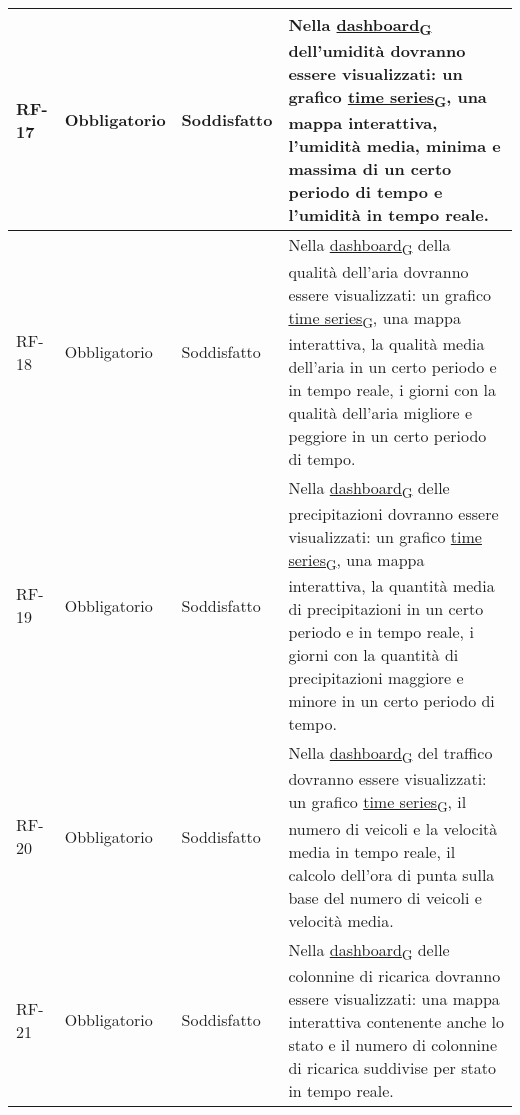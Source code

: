 \begin{longtable}{|>{\centering\arraybackslash}m{}|>{\centering\arraybackslash}m{}|>{\centering\arraybackslash}m{}|>{\centering\arraybackslash}m{}|}
	\\\hline
	RF-17           & Obbligatorio        & Soddisfatto & Nella \href{https://7last.github.io/docs/rtb/documentazione-interna/glossario\#dashboard}{dashboard\textsubscript{G}} dell'umidità dovranno essere visualizzati: un grafico \href{https://7last.github.io/docs/rtb/documentazione-interna/glossario\#time-series}{time series\textsubscript{G}}, una mappa interattiva, l'umidità media, minima e massima di un certo periodo di tempo e l'umidità in tempo reale.
	\\\hline
	RF-18           & Obbligatorio        & Soddisfatto & Nella \href{https://7last.github.io/docs/rtb/documentazione-interna/glossario\#dashboard}{dashboard\textsubscript{G}} della qualità dell'aria dovranno essere visualizzati: un grafico \href{https://7last.github.io/docs/rtb/documentazione-interna/glossario\#time-series}{time series\textsubscript{G}}, una mappa interattiva, la qualità media dell'aria in un certo periodo e in tempo reale, i giorni con la qualità dell'aria migliore e peggiore in un certo periodo di tempo.
	\\\hline
	RF-19           & Obbligatorio        & Soddisfatto & Nella \href{https://7last.github.io/docs/rtb/documentazione-interna/glossario\#dashboard}{dashboard\textsubscript{G}} delle precipitazioni dovranno essere visualizzati: un grafico \href{https://7last.github.io/docs/rtb/documentazione-interna/glossario\#time-series}{time series\textsubscript{G}}, una mappa interattiva, la quantità media di precipitazioni in un certo periodo e in tempo reale, i giorni con la quantità di precipitazioni maggiore e minore in un certo periodo di tempo.
	\\\hline
	RF-20           & Obbligatorio        & Soddisfatto & Nella \href{https://7last.github.io/docs/rtb/documentazione-interna/glossario\#dashboard}{dashboard\textsubscript{G}} del traffico dovranno essere visualizzati: un grafico \href{https://7last.github.io/docs/rtb/documentazione-interna/glossario\#time-series}{time series\textsubscript{G}}, il numero di veicoli e la velocità media in tempo reale, il calcolo dell'ora di punta sulla base del numero di veicoli e velocità media.
	\\\hline
	RF-21           & Obbligatorio        & Soddisfatto & Nella \href{https://7last.github.io/docs/rtb/documentazione-interna/glossario\#dashboard}{dashboard\textsubscript{G}} delle colonnine di ricarica dovranno essere visualizzati: una mappa interattiva contenente anche lo stato e il numero di colonnine di ricarica suddivise per stato in tempo reale.

\end{longtable}
